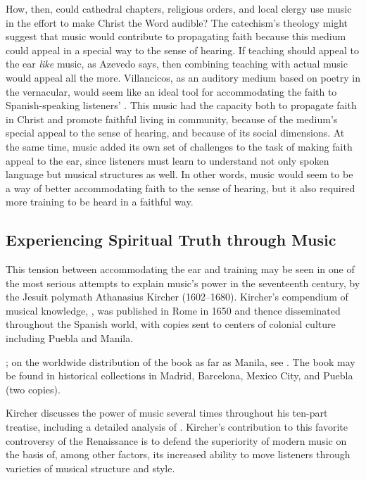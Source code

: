 How, then, could cathedral chapters, religious orders, and local clergy use
music in the effort to make Christ the Word audible? 
The catechism's theology might suggest that music would contribute to
propagating faith because this medium could appeal in a special way to the sense
of hearing.
If teaching should appeal to the ear \emph{like} music, as Azevedo says, then
combining teaching with actual music would appeal all the more.
Villancicos, as an auditory medium based on poetry in the vernacular, would seem
like an ideal tool for accommodating the faith to Spanish-speaking listeners'
.
This music had the capacity both to propagate faith in Christ and promote
faithful living in community, because of the medium's special appeal to the
sense of hearing, and because of its social dimensions.
At the same time, music added its own set of challenges to the task of making
faith appeal to the ear, since listeners must learn to understand not only
spoken language but musical structures as well.
In other words, music would seem to be a way of better accommodating faith to
the sense of hearing, but it also required more training to be heard in a
faithful way.

\subsection{Experiencing Spiritual Truth through Music}

This tension between accommodating the ear and training may be seen in one of
the most serious attempts to explain music's power in the seventeenth century,
by the Jesuit polymath Athanasius Kircher (1602--1680).
Kircher's compendium of musical knowledge, , was
published in Rome in 1650 and thence disseminated throughout the Spanish world,
with copies sent to centers of colonial culture including Puebla and Manila.%
\begin{Footnote}
    \Autocites{Findlen:Kircher}{Godwin:KircherTheater};
    on the worldwide distribution of the book as far as Manila, see
    \autocite[48--50]{Irving:Colonial}.  
    The book may be found in historical collections in Madrid, Barcelona, Mexico
    City, and Puebla (two copies). %
\end{Footnote}
Kircher discusses the power of music several times throughout his ten-part
treatise, including a detailed analysis of .%
    \Autocite[, ]{Kircher:Musurgia}
Kircher's contribution to this favorite controversy of the Renaissance is to
defend the superiority of modern music on the basis of, among other factors, its
increased ability to move listeners through varieties of musical structure and
style.


